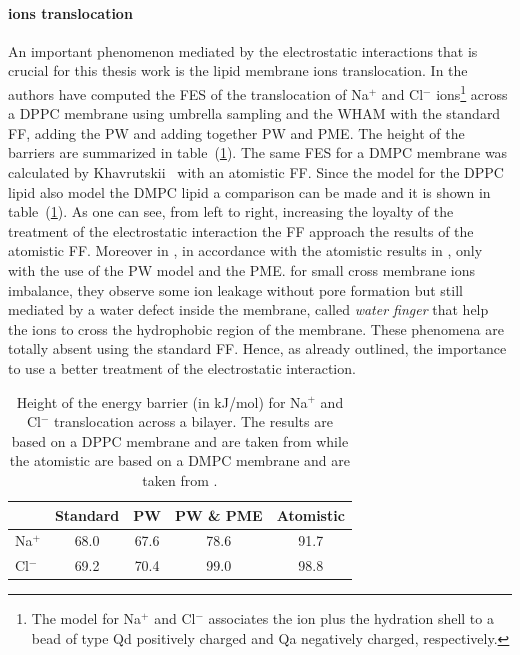 \paragraph{\textbf{ions translocation}} An important phenomenon mediated by the electrostatic interactions that is crucial for this thesis work is the lipid membrane ions translocation. In \cite{PW} the authors have computed the \ac{FES} of the translocation of Na$^+$ and Cl$^-$ ions\footnote{The \martini model for Na$^+$ and Cl$^-$ associates the ion plus the hydration shell to a bead of type Qd positively charged and Qa negatively charged, respectively.} across a \acs{DPPC} membrane using umbrella sampling and the \ac{WHAM} with the standard \martini \ac{FF}, adding the \ac{PW} and adding together \ac{PW} and \ac{PME}. The height of the barriers are summarized in table~(\ref{tab:ionTranslocation}). The same \ac{FES} for a \acs{DMPC} membrane was calculated by Khavrutskii \etal\, \cite{atomisticTranslocation} with an atomistic \ac{FF}. Since the \martini model for the \acs{DPPC} lipid also model the \acs{DMPC} lipid a comparison can be made and it is shown in table~(\ref{tab:ionTranslocation}). As one can see, from left to right, increasing the loyalty of the treatment of the electrostatic interaction the \martini \ac{FF} approach the results of the atomistic \ac{FF}. Moreover in \cite{PW}, in accordance with the atomistic results in \cite{atomisticTranslocation}, only with the use of the \ac{PW} model and the \ac{PME}. for small cross membrane ions imbalance, they observe some ion leakage without pore formation but still mediated by a water defect inside the membrane, called \textit{water finger} that help the ions to cross the hydrophobic region of the membrane. These phenomena are totally absent using the standard \martini \ac{FF}. Hence, as already outlined, the importance to use a better treatment of the electrostatic interaction.
\begin{table}[h!t]
	\centering
	\begin{tabular}{lcccc}
		\toprule
		\,		& Standard & \acs{PW} & \acs{PW} \& \acs{PME} & Atomistic	\\ \toprule
		Na$^+$	& 68.0	   & 67.6	  & 78.6					& 91.7 		\\ \midrule
		Cl$^-$	& 69.2	   & 70.4	  & 99.0					& 98.8		\\ \bottomrule
	\end{tabular}
	\caption{Height of the energy barrier (in kJ/mol) for Na$^+$ and Cl$^-$ translocation across a bilayer. The \martini results are based on a \acs{DPPC} membrane and are taken from \cite{PW} while the atomistic are based on a \acs{DMPC} membrane and are taken from \cite{atomisticTranslocation}.}
	\label{tab:ionTranslocation}
\end{table}

